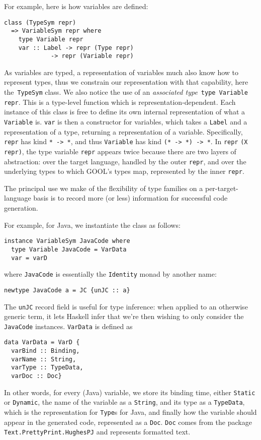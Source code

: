 \documentclass[sigplan,review,anonymous,prologue,dvipsnames]{acmart}
\begin{document}
For example, here is how variables are defined:
\begin{lstlisting}
class (TypeSym repr) 
  => VariableSym repr where
    type Variable repr
    var :: Label -> repr (Type repr) 
             -> repr (Variable repr)
\end{lstlisting}
As variables are typed, a representation of variables much also know how
to represent types, thus we constrain our representation with that capability,
here the~\verb|TypeSym| class.  We also notice the use of an
\emph{associated type}~\verb|type Variable repr|. This is a type-level
function which is representation-dependent.  Each instance of this class
is free to define its own internal representation of what a
\verb|Variable| is. \verb|var| is then a constructor for variables,
which takes a \verb|Label| and a representation of a type, returning
a representation of a variable.  Specifically, \verb|repr| has kind
\verb|* -> *|, and thus \verb|Variable| has kind \verb|(* -> *) -> *|.
In \verb|repr| \verb|(X repr)|, the type variable \verb|repr| appears 
twice because there are two layers of abstraction: over the target 
language, handled by the outer \verb|repr|, and over the underlying 
types to which GOOL's types map, represented by the inner \verb|repr|.

The principal use we make of the flexibility of type families on a
per-target-language basis is to record more (or less) information for
successful code generation.  

For example, for Java, we instantiate the class as follows:
\begin{lstlisting}
instance VariableSym JavaCode where
  type Variable JavaCode = VarData
  var = varD
\end{lstlisting}
where \verb|JavaCode| is essentially the \verb|Identity| monad
by another name:
\begin{lstlisting}
newtype JavaCode a = JC {unJC :: a}
\end{lstlisting}
The \verb|unJC| record field is useful for type inference: when applied to
an otherwise generic term, it lets Haskell infer that we're then wishing
to only consider the \verb|JavaCode| instances.  \verb|VarData| is defined as
\begin{lstlisting}
data VarData = VarD {
  varBind :: Binding, 
  varName :: String, 
  varType :: TypeData, 
  varDoc :: Doc}
\end{lstlisting}
In other words, for every (Java) variable, we store its binding time, either
\verb|Static| or \verb|Dynamic|, the name of the variable as a \verb|String|, 
and its type as a \verb|TypeData|, which is the representation for
\verb|Type|s for Java, and finally how the variable should appear in the 
generated code, represented as a \verb|Doc|. \verb|Doc| comes from the 
package \verb|Text.PrettyPrint.HughesPJ| and represents formatted text. 
\end{document}
